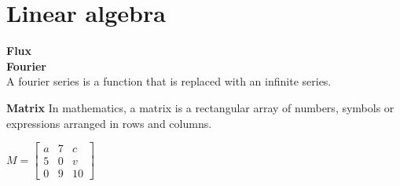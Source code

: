 \section{Linear algebra}


\textbf{Flux} \\

\textbf{Fourier} \\
A fourier series is a function that is replaced with an infinite series.  

\textbf{Matrix}
In mathematics, a matrix is a rectangular array of numbers, symbols or expressions arranged in rows and columns. 

$M = \begin{bmatrix}
       a & 7 & c           \\[0.3em]
       5 & 0 & v \\[0.3em]
       0 & 9 & 10
     \end{bmatrix}$
